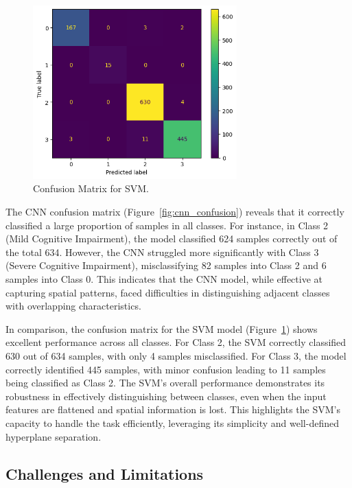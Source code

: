 \documentclass[runningheads]{llncs}
\begin{document}
\begin{figure}[htbp]
    \centering
    \includegraphics[width=0.7\textwidth]{svm_confusion_matrix.png}
    \caption{Confusion Matrix for SVM.}
    \label{fig:svm_confusion}
\end{figure}

The CNN confusion matrix (Figure~\ref{fig:cnn_confusion}) reveals that it correctly classified a large proportion of samples in all classes. For instance, in Class 2 (Mild Cognitive Impairment), the model classified 624 samples correctly out of the total 634. However, the CNN struggled more significantly with Class 3 (Severe Cognitive Impairment), misclassifying 82 samples into Class 2 and 6 samples into Class 0. This indicates that the CNN model, while effective at capturing spatial patterns, faced difficulties in distinguishing adjacent classes with overlapping characteristics.

In comparison, the confusion matrix for the SVM model  (Figure~\ref{fig:svm_confusion}) shows excellent performance across all classes. For Class 2, the SVM correctly classified 630 out of 634 samples, with only 4 samples misclassified. For Class 3, the model correctly identified 445 samples, with minor confusion leading to 11 samples being classified as Class 2. The SVM's overall performance demonstrates its robustness in effectively distinguishing between classes, even when the input features are flattened and spatial information is lost. This highlights the SVM's capacity to handle the task efficiently, leveraging its simplicity and well-defined hyperplane separation.

\subsection{Challenges and Limitations}
\end{document}
